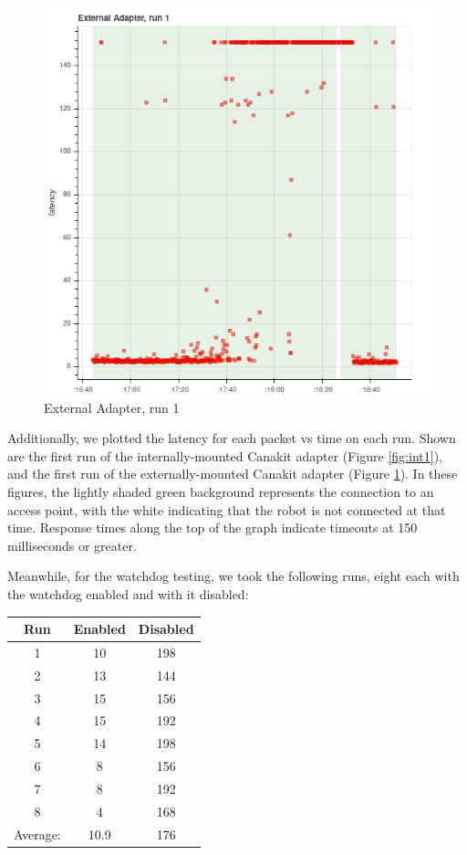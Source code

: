 \documentclass{IEEEtran}
\begin{document}
\begin{figure}
  \includegraphics[width=\linewidth]{external-1.png}
  \caption{External Adapter, run 1}
  \label{fig:ext1}
\end{figure}

Additionally, we plotted the latency for each packet vs time on each run.
Shown are the first run of the internally-mounted Canakit adapter
(Figure \ref{fig:int1}), and the first run of the externally-mounted Canakit
adapter (Figure \ref{fig:ext1}). In these figures, the lightly shaded green
background represents the connection to an access point, with the white
indicating that the robot is not connected at that time. Response times along
the top of the graph indicate timeouts at 150 milliseconds or greater.

Meanwhile, for the watchdog testing, we took the following runs, eight each
with the watchdog enabled and with it disabled:

\begin{tabular}{ c | c | c }
  \centering
  Run & Enabled & Disabled \\ \hline
  1 & 10 & 198 \\
  2 & 13 & 144 \\
  3 & 15 & 156 \\
  4 & 15 & 192 \\
  5 & 14 & 198 \\
  6 &  8 & 156 \\
  7 &  8 & 192 \\
  8 &  4 & 168 \\
  \hline
  Average: & 10.9 & 176
\end{tabular}
\end{document}
